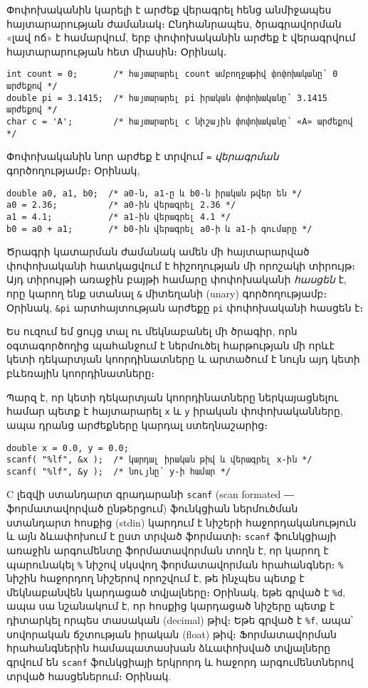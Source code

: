 Փոփոխականին կարելի է արժեք վերագրել հենց անմիջապես հայտարարության
ժամանակ։ Ընդհանրապես, ծրագրավորման «լավ ոճ» է համարվում, երբ փոփոխականին
արժեք է վերագրվում հայտարարության հետ միասին։ Օրինակ․

\begin{verbatim}
int count = 0;       /* հայտարարել count ամբողջաթիվ փոփոխականը՝ 0 արժեքով */
double pi = 3.1415;  /* հայտարարել pi իրական փոփոխականը՝ 3.1415 արժեքով */
char c = 'A';        /* հայտարարել c նիշային փոփոխականը՝ «A» արժեքով */
\end{verbatim}

Փոփոխականին նոր արժեք է տրվում \texttt{=} \emph{վերագրման}
գործողությամբ։ Օրինակ,

\begin{verbatim}
double a0, a1, b0;  /* a0-ն, a1-ը և b0-ն իրական թվեր են */
a0 = 2.36;          /* a0-ին վերագրել 2.36 */
a1 = 4.1;           /* a1-ին վերագրել 4.1 */
b0 = a0 + a1;       /* b0-ին վերագրել a0-ի և a1-ի գումարը */
\end{verbatim}

Ծրագրի կատարման ժամանակ ամեն մի հայտարարված փոփոխականի հատկացվում է
հիշողության մի որոշակի տիրույթ։ Այդ տիրույթի առաջին բայթի համարը
փոփոխականի \emph{հասցեն} է, որը կարող ենք ստանալ \texttt{\&} միտեղանի
(unary) գործողությամբ։ Օրինակ, \texttt{\&pi} արտհայտության արժեքը
\texttt{pi} փոփոխականի հասցեն է։

Ես ուզում եմ ցույց տալ ու մեկնաբանել մի ծրագիր, որն օգտագործողից
պահանջում է ներմուծել հարթության մի որևէ կետի դեկարտյան կոորդինատները և
արտածում է նույն այդ կետի բևեռային կոորդինատները։

Պարզ է, որ կետի դեկարտյան կոորդինատները ներկայացնելու համար պետք է
հայտարարել \texttt{x} և \texttt{y} իրական փոփոխականները, ապա դրանց
արժեքները կարդալ ստեղնաշարից։

\begin{verbatim}
double x = 0.0, y = 0.0;
scanf( "%lf", &x );  /* կարդալ իրական թիվ և վերագրել x-ին */
scanf( "%lf", &y );  /* նույնը՝ y-ի համար */
\end{verbatim}

C լեզվի ստանդարտ գրադարանի \texttt{scanf} (scan formated ― ֆորմատավորված
ընթերցում) ֆունկցիան ներմուծման ստանդարտ հոսքից (stdin) կարդում է նիշերի
հաջորդականություն և այն ձևափոխում է ըստ տրված ֆորմատի։ \texttt{scanf}
ֆունկցիայի առաջին արգումենտը ֆորմատավորման տողն է, որ կարող է պարունակել
\texttt{\%} նիշով սկսվող ֆորմատավորման հրահանգներ։ \texttt{\%} նիշին
հաջորդող նիշերով որոշվում է, թե ինչպես պետք է մեկնաբանվեն կարդացած
տվյալները։ Օրինակ, եթե գրված է \texttt{\%d}, ապա սա նշանակում է, որ
հոսքից կարդացած նիշերը պետք է դիտարկել որպես տասական (decimal) թիվ։ Եթե
գրված է \texttt{\%f}, ապա՝ սովորական ճշտության իրական (float) թիվ։
Ֆորմատավորման հրահանգներին համապատասխան ձևափոխված տվյալները գրվում են
\texttt{scanf} ֆունկցիայի երկրորդ և հաջորդ արգումենտներով տրված
հասցեներում։ Օրինակ.

